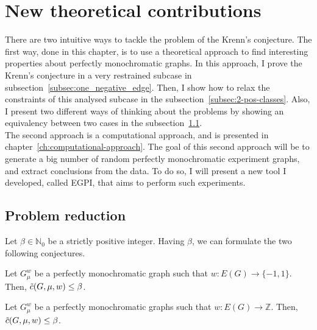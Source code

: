 \chapter{New theoretical contributions}
\label{ch:new-contributions}

There are two intuitive ways to tackle the problem of the Krenn's conjecture.
The first way, done in this chapter, is to use a theoretical approach to find interesting properties about perfectly monochromatic graphs.
In this approach, I prove the Krenn's conjecture in a very restrained subcase in subsection~\ref{subsec:one_negative_edge}.
Then, I show how to relax the constraints of this analysed subcase in the subsection~\ref{subsec:2-pos-classes}.
Also, I present two different ways of thinking about the problems by showing an equivalency between two cases in the subsection~\ref{sec:problem-reduction}.\\

The second approach is a computational approach, and is presented in chapter~\ref{ch:computational-approach}.
The goal of this second approach will be to generate a big number of random perfectly monochromatic experiment graphs, and extract conclusions from the data.
To do so, I will present a new tool I developed, called EGPI, that aims to perform such experiments.


\section{Problem reduction}
\label{sec:problem-reduction}

Let $\beta \in \mathbb{N}_0$ be a strictly positive integer.
Having $\beta$, we can formulate the two following conjectures.

\begin{conjecture}
    \label{con:c-bounded-by-beta-binary}
    Let $G_\mu^w$ be a perfectly monochromatic graph such that $w: E(G) \rightarrow \{-1, 1\}$.
    Then, $\Tilde{c}(G, \mu, w) \leq \beta$.
\end{conjecture}

\begin{conjecture}
    \label{con:c-bounded-by-beta-integer}
    Let $G_\mu^w$ be a perfectly monochromatic graphs such that $w: E(G) \rightarrow \mathbb{Z}$.
    Then, $\Tilde{c}(G, \mu, w) \leq \beta$.
\end{conjecture}


